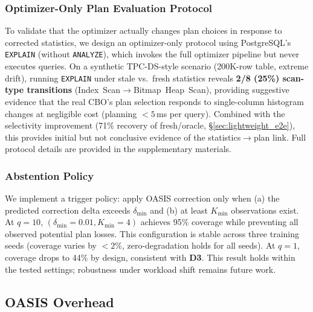 \documentclass[runningheads]{llncs}
\begin{document}
\subsubsection{Optimizer-Only Plan Evaluation Protocol}
\label{sec:optimizer_only_e2e}

To validate that the optimizer actually changes plan choices in response to corrected statistics, we design an optimizer-only protocol using PostgreSQL's \texttt{EXPLAIN} (without \texttt{ANALYZE}), which invokes the full optimizer pipeline but never executes queries. On a synthetic TPC-DS-style scenario (200K-row table, extreme drift), running \texttt{EXPLAIN} under stale vs.\ fresh statistics reveals \textbf{2/8 (25\%) scan-type transitions} (Index~Scan$\rightarrow$Bitmap~Heap~Scan), providing suggestive evidence that the real CBO's plan selection responds to single-column histogram changes at negligible cost (planning $<5$\,ms per query). Combined with the selectivity improvement (71\% recovery of fresh/oracle, \S\ref{sec:lightweight_e2e}), this provides initial but not conclusive evidence of the statistics$\rightarrow$plan link. Full protocol details are provided in the supplementary materials.

\subsubsection{Abstention Policy}
\label{sec:abstention}

We implement a trigger policy: apply OASIS correction only when (a) the predicted correction delta exceeds $\delta_{\min}$ and (b) at least $K_{\min}$ observations exist. At $q{=}10$, $(\delta_{\min}{=}0.01, K_{\min}{=}4)$ achieves 95\% coverage while preventing all observed potential plan losses. This configuration is stable across three training seeds (coverage varies by ${<}2\%$, zero-degradation holds for all seeds). At $q{=}1$, coverage drops to 44\% by design, consistent with \textbf{D3}. This result holds within the tested settings; robustness under workload shift remains future work.


\subsection{OASIS Overhead}
\label{sec:oasis-overhead}
\end{document}
